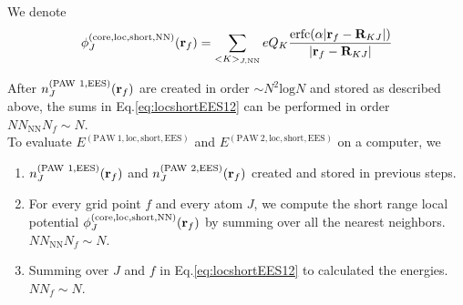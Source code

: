 \documentclass[paper=a4, fontsize=11pt]{article} %
\numberwithin{equation}{section} %
\numberwithin{figure}{section} %
\numberwithin{table}{section} %
\newcommand{\br}{{\bf{r}}}
\newcommand{\bR}{{\bf{R}}}
\newcommand{\rEES}{{\mathrm{EES}}}
\newcommand{\rcore}{{\mathrm{core}}}
\newcommand{\rNN}{{\mathrm{NN}}}
\newcommand{\rshort}{{\mathrm{short}}}
\newcommand{\rerfc}{{\mathrm{erfc}}}
\newcommand{\rP}{{\mathrm{PAW}}}
\newcommand{\rlo}{{\mathrm{loc}}}
\newcommand{\rl}{{\mathrm{log}}}
\begin{document}
We denote
\begin{equation}
\phi_J^{(\rcore,\rlo,\rshort,\rNN)}(\br_f) = \sum_{<K>_{J,\rNN}}eQ_K\frac{\rerfc(\alpha|\br_f-\bR_{KJ}|)}{|\br_f-\bR_{KJ}|}
\end{equation}


After $n_J^{(\rP\ 1,\rEES)}(\br_f)$ are created in order $\sim N^2 \rl N$ and stored as described above, the sums in Eq.\eqref{eq:locshortEES12} can be performed in order $NN_{\rNN}N_f \sim N$.\\

To evaluate $E^{(\rP\ 1,\rlo,\rshort,\rEES)}$ and $E^{(\rP\ 2,\rlo,\rshort,\rEES)}$ on a computer, we
\begin{enumerate}
\item $n_J^{(\rP\ 1,\rEES)}(\br_f)$ and $n_J^{(\rP\ 2,\rEES)}(\br_f)$ created and stored in previous steps.
\item For every grid point $f$ and every atom $J$, we compute the short range local potential $\phi_J^{(\rcore,\rlo,\rshort,\rNN)}(\br_f)$ by summing over all the nearest neighbors. $NN_{\rNN}N_f \sim N$.
\item Summing over $J$ and $f$ in Eq.\eqref{eq:locshortEES12} to calculated the energies. $NN_f \sim N$.
\end{enumerate}
\end{document}
